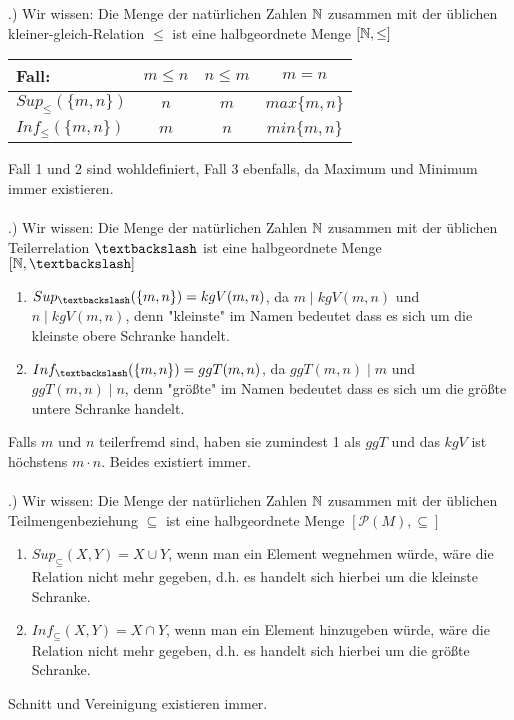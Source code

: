 \documentclass[titlepage]{article}\usepackage{babel}\usepackage{amsmath}\usepackage{amssymb}\usepackage{amsthm}\usepackage{multicol}\usepackage{graphicx}\usepackage[normalem]{ulem}\usepackage{tabto}\usepackage{hyperref}\usepackage{tikz}\usepackage{pgfplots}\pgfplotsset{compat=1.15}\usepackage{mathrsfs}\usetikzlibrary{arrows}\usetikzlibrary{shapes.geometric}\usepackage{wasysym}\usepackage{bbm}\usepackage{bbold}\usepackage{xcolor}\usepackage[T1]{fontenc}\usepackage{mathrsfs}\usepackage[utf8]{inputenc}\usepackage{listings}\pagestyle{plain}\pagenumbering{arabic}\renewcommand{\arraystretch}{1.3}\newcommand{\n}{\newline}\usepackage[left=20mm, right=15mm, top=25mm, bottom=7mm, paper=a4paper]{geometry}\renewcommand{\contentsname}{Inhaltsverzeichnis}\newcommand{\K}{\mathbb{K}}\newcommand{\C}{\mathbb{C}}\newcommand{\N}{\mathbb{N}}\newcommand{\Q}{\mathbb{Q}}\newcommand{\R}{\mathbb{R}}\newcommand{\1}{\mathbb{1}}\newcommand{\0}{\mathbb{0}}\newcommand{\Z}{\mathbb{Z}}\renewcommand{\)}{\right)}\renewcommand{\(}{\left(}
\begin{document}
	.) Wir wissen: Die Menge der natürlichen Zahlen $\N$ zusammen mit der üblichen kleiner-gleich-Relation $\le$ ist eine halbgeordnete Menge $[\N,\le]$
	\begin{table}[h]
		\begin{tabular}{l|c|c|c}
			Fall:&$m\le n$&$n\le m$&$m=n$\\\hline
			 $Sup_{\le}(\{m,n\})$&$n$&$m$&$max\{m,n\}$\\
			 $Inf_{\le}(\{m,n\})$&$m$&$n$&$min\{m,n\}$
		\end{tabular}
	\end{table}

	\noindent Fall 1 und 2 sind wohldefiniert, Fall 3 ebenfalls, da Maximum und Minimum immer existieren.
	\\\\
		
	.) Wir wissen: Die Menge der natürlichen Zahlen $\N$ zusammen mit der üblichen Teilerrelation $\textbackslash$ ist eine halbgeordnete Menge $[\N,\textbackslash]$
	\begin{enumerate}
		\item[]$Sup_{\textbackslash}(\{m,n\})=kgV(m,n)$, da $m\mid kgV(m,n)$ und $n\mid kgV(m,n)$, denn "kleinste" im Namen bedeutet dass es sich um die kleinste obere Schranke handelt.
		\item[]$Inf_{\textbackslash}(\{m,n\})=ggT(m,n)$, da $ggT(m,n)\mid m$ und $ggT(m,n)\mid n$, denn "größte" im Namen bedeutet dass es sich um die größte untere Schranke handelt.
	\end{enumerate}
	\noindent Falls $m$ und $n$ teilerfremd sind, haben sie zumindest 1 als $ggT$ und das $kgV$ ist höchstens $m\cdot n$. Beides existiert immer.
	\\\\
	.) Wir wissen: Die Menge der natürlichen Zahlen $\N$ zusammen mit der üblichen Teilmengenbeziehung $\subseteq$ ist eine halbgeordnete Menge $[\mathscr{P}(M),\subseteq]$
	\begin{enumerate}
		\item[]$Sup_{\subseteq}(X,Y)=X\cup Y$, wenn man ein Element wegnehmen würde, wäre die Relation nicht mehr gegeben, d.h. es handelt sich hierbei um die kleinste Schranke.
		\item[]$Inf_{\subseteq}(X,Y)=X\cap Y$, wenn man ein Element hinzugeben würde, wäre die Relation nicht mehr gegeben, d.h. es handelt sich hierbei um die größte Schranke.
	\end{enumerate}
	\noindent Schnitt und Vereinigung existieren immer.
	
\end{document}
